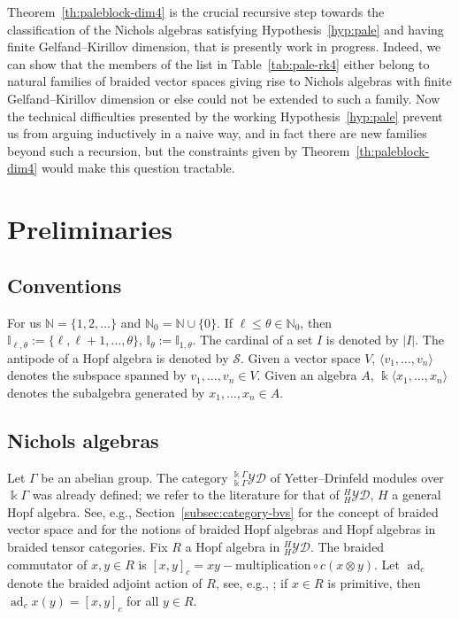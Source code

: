 \documentclass[10pt,a4paper]{amsart}
\numberwithin{equation}{section}
\newcommand{\adc}{\operatorname{ad}_c}
\newcommand{\Ss}{\mathcal{S}}
\newcommand{\I}{{\mathbb I}}
\newcommand{\N}{{\mathbb N}}
\newcommand{\yd}[1]{{}_{#1}^{#1}\mathcal{YD}}
\begin{document}
Theorem~\ref{th:paleblock-dim4} is the crucial recursive step towards the classification of the Nichols algebras
satisfying Hypothesis~\ref{hyp:pale} and having finite Gelfand--Kirillov dimension, that is presently work in progress.
Indeed, we can show that the members of the list in Table~\ref{tab:pale-rk4}
either belong to natural families of braided vector spaces giving rise to Nichols algebras with finite Gelfand--Kirillov dimension
or else could not be extended to such a family.
Now the technical difficulties presented by the working Hypothesis~\ref{hyp:pale} prevent us from arguing inductively
in a naive way, and in fact there are new families beyond such a recursion, but the constraints given by Theorem~\ref{th:paleblock-dim4} would make this question tractable.


\section{Preliminaries}
\subsection{Conventions}
For us $\mathbb{N} = \{1,2,\dots\}$ and $\N_0 = \N \cup \{0\}$.
If $\ell \leq \theta \in\N_0$, then $\I_{\ell, \theta} := \{\ell, \ell +1,\dots,\theta\}$, $\I_{\theta} := \I_{1, \theta}$.
The cardinal of a set $I$ is denoted by $\vert I \vert$.
The antipode of a Hopf algebra is denoted by $\Ss$.
Given a vector space $V$, $\langle v_1, \dots, v_n\rangle$ denotes the subspace spanned by $v_1, \dots, v_n \in V$.
Given an algebra $A$, $\Bbbk\langle x_1, \dots, x_n\rangle$ denotes the subalgebra generated by $x_1, \dots, x_n \in A$.


\subsection{Nichols algebras}%
Let $\Gamma$ be an abelian group.
The category $\yd{\Bbbk \Gamma}$ of Yetter--Drinfeld modules over $\Bbbk\Gamma$
was already defined; we refer to the literature for that of $\yd{H}$, $H$ a general Hopf algebra. See, e.g., Section~\ref{subsec:category-bvs}
for the concept of braided vector space and
\cite{A-leyva} for the notions of braided Hopf algebras and Hopf algebras in braided tensor categories.
Fix $R$ a Hopf algebra in $\yd{H}$. The braided commutator of $x,y\in R$ is $[x,y]_c = xy - \text{multiplication} \circ c (x\otimes y)$.
Let $\adc$ denote the braided adjoint action of $R$, see, e.g., \cite[p.~165]{A-leyva};
if $x\in R$ is primitive, then
$\adc x (y) =[x,y]_c$ for all $y\in R$.
\end{document}
